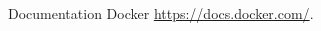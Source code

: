 \documentclass[a4paper]{report}
\begin{document}
\newcommand{\HRule}{\rule{\linewidth}{0.5mm}}


\newpage
~
\thispagestyle{empty}
\newpage


\tableofcontents
\thispagestyle{empty}
\setcounter{page}{0}

\newpage

\renewcommand{\arraystretch}{1.5}


\thispagestyle{empty}
\setcounter{page}{0}
\newpage

	   
%


\newpage



\newpage
\begin{thebibliography}{9}

          Documentation Docker
          \url{https://docs.docker.com/}.

\end{thebibliography}
\end{document}
